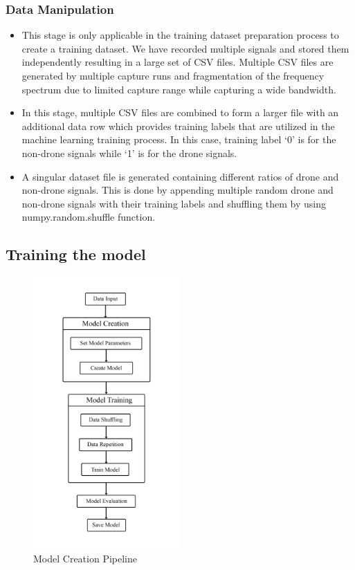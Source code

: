 \subsubsection*{Data Manipulation}
\begin{itemize}
  \item This stage is only applicable in the training dataset preparation process to create a training dataset. We have recorded multiple signals and stored them independently resulting in a large set of CSV files. Multiple CSV files are generated by multiple capture runs and fragmentation of the frequency spectrum due to limited capture range while capturing a wide bandwidth.
  \item In this stage, multiple CSV files are combined to form a larger file with an additional data row which provides training labels that are utilized in the machine learning training process. In this case, training label ‘0’ is for the non-drone signals while ‘1’ is for the drone signals.
  \item A singular dataset file is generated containing different ratios of drone and non-drone signals. This is done by appending multiple random drone and non-drone signals with their training labels and shuffling them by using numpy.random.shuffle function.


\end{itemize}

\subsection{Training the model}
\begin{figure}[H]
  \centering
  \includegraphics[width=0.5\textwidth]{ML training.png}
  \caption{Model Creation Pipeline}
\end{figure}

